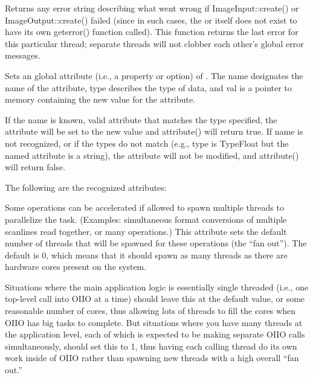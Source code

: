 Returns any error string describing what went wrong if 
{\cf ImageInput::create()} or \\ {\cf ImageOutput::create()} failed
(since in such cases, the \ImageInput or \ImageOutput itself does 
not exist to have its own {\cf geterror()} function called).
This function returns the last error
for this particular thread; separate threads will not clobber each
other's global error messages.
\apiend


\label{sec:globalattribute}

Sets an global attribute (i.e., a property or option) of \product.
The {\cf name} designates the name of the attribute, {\cf type}
describes the type of data, and {\cf val} is a pointer to memory 
containing the new value for the attribute.

If the name is known, valid attribute that matches the type specified,
the attribute will be set to the new value and {\cf attribute()} will
return {\cf true}.  If {\cf name} is not recognized, or if the types do
not match (e.g., {\cf type} is {\cf TypeFloat} but the named
attribute is a string), the attribute will not be modified, and {\cf
  attribute()} will return {\cf false}.

\noindent The following are the recognized attributes:

\vspace{10pt}
 \label{sec:attribute:threads}
Some \product operations can be accelerated if allowed to spawn multiple
threads to parallelize the task.  (Examples: simultaneous format conversions
of multiple scanlines read together, or many \ImageBufAlgo operations.)
This attribute sets the default number of threads that will be spawned
for these operations (the ``fan out'').
The default is 0, which means that it should spawn as many
threads as there are hardware cores present on the system.

Situations where the main application logic is essentially single threaded
(i.e., one top-level call into OIIO at a time) should leave this at the
default value, or some reasonable number of cores, thus allowing lots of
threads to fill the cores when OIIO has big tasks to complete. But
situations where you have many threads at the application level, each of
which is expected to be making separate OIIO calls simultaneously, should
set this to 1, thus having each calling thread do its own work inside of
OIIO rather than spawning new threads with a high overall ``fan out.''
\apiend

